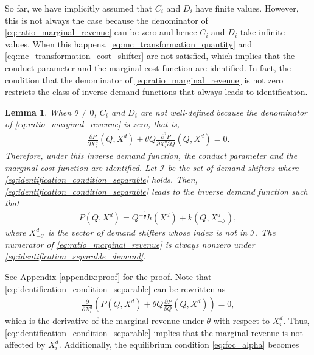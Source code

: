 \documentclass[11pt, a4paper]{article}
\newtheorem{lemma}{Lemma}
\theoremstyle{remark}
\begin{document}
So far, we have implicitly assumed that $C_i$ and $D_i$ have finite values.
However, this is not always the case because the denominator of \eqref{eq:ratio_marginal_revenue} can be zero and hence $C_i$ and $D_i$ take infinite values.
When this happens, \eqref{eq:mc_transformation_quantity} and \eqref{eq:mc_transformation_cost_shifter} are not satisfied, which implies that the conduct parameter and the marginal cost function are identified.
In fact, the condition that the denominator of \eqref{eq:ratio_marginal_revenue} is not zero restricts the class of inverse demand functions that always leads to identification.
\begin{lemma}\label{lemma:identification_condition_separable}
    When $\theta \ne 0$, $C_i$ and $D_i$ are not well-defined because the denominator of \eqref{eq:ratio_marginal_revenue} is zero, that is, 
    \begin{align}
        \frac{\partial P}{\partial X^{d}_i}(Q, X^{d}) + \theta Q\frac{\partial^2 P}{\partial X^{d}_{i}\partial Q}(Q, X^{d}) = 0. \label{eq:identification_condition_separable}
    \end{align}
    Therefore, under this inverse demand function, the conduct parameter and the marginal cost function are identified.
    Let $\mathcal{I}$ be the set of demand shifters where \eqref{eq:identification_condition_separable} holds.
    Then, \eqref{eq:identification_condition_separable} leads to the inverse demand function such that
    \begin{align}
        P(Q, X^{d}) = Q^{-\frac{1}{\theta}}h(X^{d}) + k(Q, X^{d}_{-\mathcal{I}}), \label{eq:identification_separable_demand}
    \end{align}
    where $X^{d}_{-\mathcal{I}}$ is the vector of demand shifters whose index is not in $\mathcal{I}$.
    The numerator of \eqref{eq:ratio_marginal_revenue} is always nonzero under \eqref{eq:identification_separable_demand}.
\end{lemma}
See Appendix \ref{appendix:proof} for the proof.
Note that \eqref{eq:identification_condition_separable} can be rewritten as
\begin{align}
    \frac{\partial }{\partial X^{d}_i}\left( P(Q, X^{d}) + \theta Q \frac{\partial P}{\partial Q}(Q, X^{d})\right) = 0,
\end{align}
which is the derivative of the marginal revenue under $\theta$ with respect to $X^{d}_i$.
Thus, \eqref{eq:identification_condition_separable} implies that the marginal revenue is not affected by $X^{d}_i$.
Additionally, the equilibrium condition \eqref{eq:foc_alpha} becomes
\end{document}
